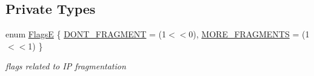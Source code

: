 \subsection*{Private Types}
\begin{DoxyCompactItemize}
\item 
enum \hyperlink{classns3_1_1Ipv4Header_a26f8d90c75157c0414fb741ece87a032}{FlagsE} \{ \hyperlink{classns3_1_1Ipv4Header_a26f8d90c75157c0414fb741ece87a032a68333c7c706b8f2300f634fac93deebd}{D\+O\+N\+T\+\_\+\+F\+R\+A\+G\+M\+E\+NT} = (1$<$$<$0), 
\hyperlink{classns3_1_1Ipv4Header_a26f8d90c75157c0414fb741ece87a032a4f8aa2cabec9f9acae9fc9105e38e671}{M\+O\+R\+E\+\_\+\+F\+R\+A\+G\+M\+E\+N\+TS} = (1$<$$<$1)
 \}\begin{DoxyCompactList}\small\item\em flags related to IP fragmentation \end{DoxyCompactList}
\end{DoxyCompactItemize}
